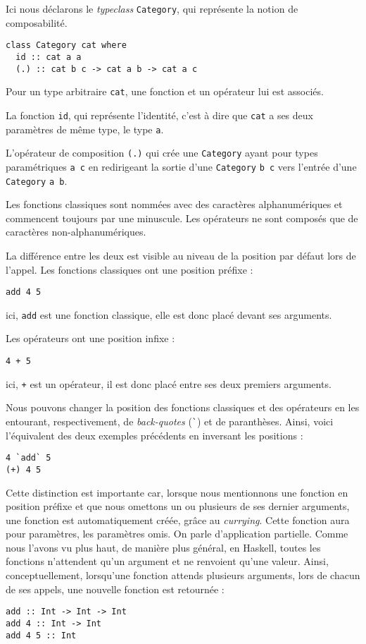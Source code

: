 \documentclass{llncs}
\begin{document}
Ici nous déclarons le \emph{typeclass} \lstinline{Category}, qui représente
la notion de composabilité.
\begin{lstlisting}
class Category cat where
  id :: cat a a
  (.) :: cat b c -> cat a b -> cat a c
\end{lstlisting}

Pour un type arbitraire \lstinline{cat}, une fonction et un opérateur lui est
associés.

La fonction \lstinline{id}, qui représente l'identité, c'est à dire
que \lstinline{cat} a ses deux paramètres de même type, le type \lstinline{a}.

L'opérateur de composition \lstinline{(.)} qui crée une \lstinline{Category}
ayant pour types paramétriques \lstinline{a c} en redirigeant la sortie d'une
\lstinline{Category} \lstinline{b c} vers l'entrée d'une \lstinline{Category} \lstinline{a b}.

Les fonctions classiques sont nommées avec des caractères alphanumériques et commencent
toujours par une minuscule.
Les opérateurs ne sont composés que de caractères non-alphanumériques.

La différence entre les deux est visible au niveau de la position par défaut lors
de l'appel.
Les fonctions classiques ont une position préfixe :
\begin{lstlisting}
add 4 5
\end{lstlisting}

ici, \lstinline{add} est une fonction classique, elle est donc placé devant ses
arguments.

Les opérateurs ont une position infixe :
\begin{lstlisting}
4 + 5
\end{lstlisting}

ici, \lstinline{+} est un opérateur, il est donc placé entre ses deux premiers
arguments.

Nous pouvons changer la position des fonctions classiques et des opérateurs en
les entourant, respectivement, de \emph{back-quotes} (\lstinline{`}) et de paranthèses.
Ainsi, voici l'équivalent des deux exemples précédents en inversant les positions :
\begin{lstlisting}
4 `add` 5
(+) 4 5
\end{lstlisting}

Cette distinction est importante car, lorsque nous mentionnons une fonction en position
préfixe et que nous omettons un ou plusieurs de ses dernier arguments, une fonction
est automatiquement créée, grâce au \emph{currying}.
Cette fonction aura pour paramètres, les paramètres omis.
On parle d'application partielle.
Comme nous l'avons vu plus haut, de manière plus général, en Haskell, toutes les
fonctions n'attendent qu'un argument et ne renvoient qu'une valeur.
Ainsi, conceptuellement, lorsqu'une fonction attends plusieurs arguments, lors de
chacun de ses appels, une nouvelle fonction est retournée :
\begin{lstlisting}
add :: Int -> Int -> Int
add 4 :: Int -> Int
add 4 5 :: Int
\end{lstlisting}
\end{document}

